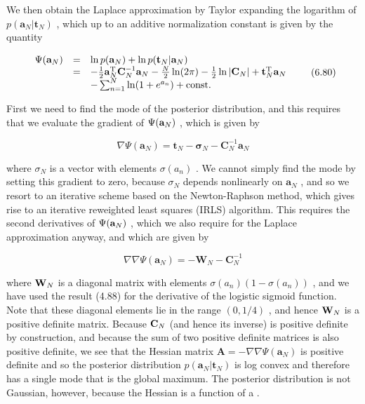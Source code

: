 \documentclass[
  10
]{article}
\begin{document}
We then obtain the Laplace approximation by Taylor expanding the
logarithm of \(p ( \mathbf { a } _ { N } | \mathbf { t } _ { N } )\) ,
which up to an additive normalization constant is given by the quantity

\[
\begin{array}{r c l} \Psi (\mathbf {a} _ {N}) & = & \ln p (\mathbf {a} _ {N}) + \ln p (\mathbf {t} _ {N} | \mathbf {a} _ {N}) \\ & = & - \frac {1}{2} \mathbf {a} _ {N} ^ {\mathrm{T}} \mathbf {C} _ {N} ^ {- 1} \mathbf {a} _ {N} - \frac {N}{2} \ln (2 \pi) - \frac {1}{2} \ln | \mathbf {C} _ {N} | + \mathbf {t} _ {N} ^ {\mathrm{T}} \mathbf {a} _ {N} \\ & & - \sum_ {n = 1} ^ {N} \ln (1 + e ^ {a _ {n}}) + \text {const.} \end{array}\tag{6.80}
\]

First we need to find the mode of the posterior distribution, and this
requires that we evaluate the gradient of \(\Psi ( { \bf a } _ { N } )\)
, which is given by

\[
\nabla \Psi (\mathbf {a} _ {N}) = \mathbf {t} _ {N} - \boldsymbol {\sigma} _ {N} - \mathbf {C} _ {N} ^ {- 1} \mathbf {a} _ {N}\tag{6.81}
\]

where \(\sigma _ { N }\) is a vector with elements
\(\sigma ( a _ { n } )\) . We cannot simply find the mode by setting
this gradient to zero, because \(\sigma _ { N }\) depends nonlinearly on
\(\mathbf { a } _ { N }\) , and so we resort to an iterative scheme
based on the Newton-Raphson method, which gives rise to an iterative
reweighted least squares (IRLS) algorithm. This requires the second
derivatives of \(\Psi ( { \bf a } _ { N } )\) , which we also require
for the Laplace approximation anyway, and which are given by

\[
\nabla \nabla \Psi (\mathbf {a} _ {N}) = - \mathbf {W} _ {N} - \mathbf {C} _ {N} ^ {- 1}\tag{6.82}
\]

where \({ \bf W } _ { N }\) is a diagonal matrix with elements
\(\sigma ( a _ { n } ) ( 1 - \sigma ( a _ { n } ) )\) , and we have used
the result (4.88) for the derivative of the logistic sigmoid function.
Note that these diagonal elements lie in the range \(( 0 , 1 / 4 )\) ,
and hence \({ \bf W } _ { N }\) is a positive definite matrix. Because
\({ \bf C } _ { N }\) (and hence its inverse) is positive definite by
construction, and because the sum of two positive definite matrices is
also positive definite, we see that the Hessian matrix
\(\mathbf { A } = - \nabla \nabla \Psi ( \mathbf { a } _ { N } )\) is
positive definite and so the posterior distribution
\(p ( \mathbf { a } _ { N } | \mathbf { t } _ { N } )\) is log convex
and therefore has a single mode that is the global maximum. The
posterior distribution is not Gaussian, however, because the Hessian is
a function of a .
\end{document}
